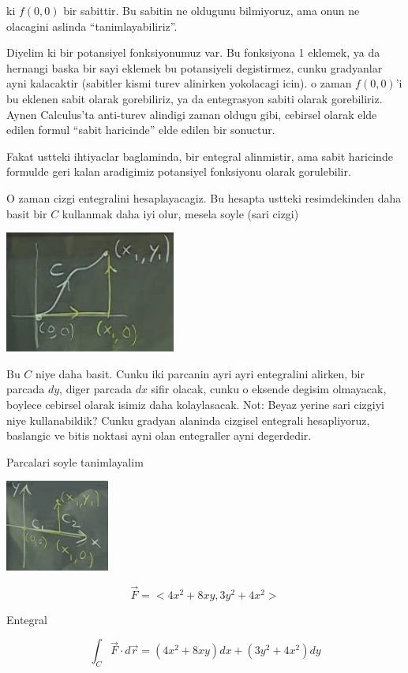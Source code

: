 \documentclass[12pt,fleqn]{article}
\begin{document}
ki $f(0,0)$ bir sabittir. Bu sabitin ne oldugunu bilmiyoruz, ama onun ne
olacagini aslinda ``tanimlayabiliriz''. 

Diyelim ki bir potansiyel fonksiyonumuz var. Bu fonksiyona 1 eklemek, ya da
hernangi baska bir sayi eklemek bu potansiyeli degistirmez, cunku
gradyanlar ayni kalacaktir (sabitler kismi turev alinirken yokolacagi
icin). o zaman $f(0,0)$'i bu eklenen sabit olarak gorebiliriz, ya da
entegrasyon sabiti olarak gorebiliriz. Aynen Calculus'ta anti-turev
alindigi zaman oldugu gibi, cebirsel olarak elde edilen formul ``sabit
haricinde'' elde edilen bir sonuctur. 

Fakat ustteki ihtiyaclar baglaminda, bir entegral alinmistir, ama sabit
haricinde formulde geri kalan aradigimiz potansiyel fonksiyonu olarak
gorulebilir. 

O zaman cizgi entegralini hesaplayacagiz. Bu hesapta ustteki resimdekinden
daha basit bir $C$ kullanmak daha iyi olur, mesela soyle (sari cizgi)

\includegraphics[height=4cm]{21_3.png}

Bu $C$ niye daha basit. Cunku iki parcanin ayri ayri entegralini alirken,
bir parcada $dy$, diger parcada $dx$ sifir olacak, cunku o eksende degisim
olmayacak, boylece cebirsel olarak isimiz daha kolaylasacak. Not: Beyaz
yerine sari cizgiyi niye kullanabildik? Cunku gradyan alaninda cizgisel
entegrali hesapliyoruz, baslangic ve bitis noktasi ayni olan entegraller
ayni degerdedir. 

Parcalari soyle tanimlayalim

\includegraphics[height=3cm]{21_4.png}

\[ \vec{F} = <4x^2 + 8xy, 3y^2 + 4x^2>\]

Entegral

\[ \int_C \vec{F} \cdot d\vec{r} = 
(4x^2 + 8xy) dx + (3y^2 + 4x^2) dy
\]
\end{document}
